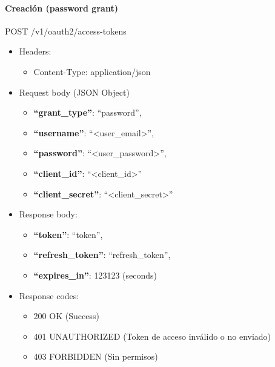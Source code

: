 \documentclass[12pt,a4paperpaper,]{report}
\providecommand{\tightlist}{%
  \setlength{\itemsep}{0pt}\setlength{\parskip}{0pt}}
\let\oldparagraph\paragraph
\renewcommand{\paragraph}[1]{\oldparagraph{#1}\mbox{}}
\begin{document}
\paragraph{Creación (password grant)}\label{creaciuxf3n-password-grant}

POST /v1/oauth2/access-tokens

\begin{itemize}
\tightlist
\item
  Headers:

  \begin{itemize}
  \tightlist
  \item
    Content-Type: application/json
  \end{itemize}
\item
  Request body (JSON Object)

  \begin{itemize}
  \tightlist
  \item
    \textbf{``grant\_type''}: ``password'',
  \item
    \textbf{``username''}: ``\textless{}user\_email\textgreater{}'',
  \item
    \textbf{``password''}: ``\textless{}user\_password\textgreater{}'',
  \item
    \textbf{``client\_id''}: ``\textless{}client\_id\textgreater{}''
  \item
    \textbf{``client\_secret''}:
    ``\textless{}client\_secret\textgreater{}''
  \end{itemize}
\item
  Response body:

  \begin{itemize}
  \tightlist
  \item
    \textbf{``token''}: ``token'',
  \item
    \textbf{``refresh\_token''}: ``refresh\_token'',
  \item
    \textbf{``expires\_in''}: 123123 (seconds)
  \end{itemize}
\item
  Response codes:

  \begin{itemize}
  \tightlist
  \item
    200 OK (Success)
  \item
    401 UNAUTHORIZED (Token de acceso inválido o no enviado)
  \item
    403 FORBIDDEN (Sin permisos)
  \end{itemize}
\end{itemize}
\end{document}

